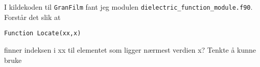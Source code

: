 
I kildekoden til \texttt{GranFilm} \: fant jeg modulen \: \texttt{dielectric\_function\_module.f90}.
Forstår det slik at 
\begin{lstlisting}[style=FormattedNumber, language=FORTRAN, frame=none]
    Function Locate(xx,x)
\end{lstlisting}
finner indeksen i xx til elementet som ligger nærmest verdien x? Tenkte å kunne bruke
